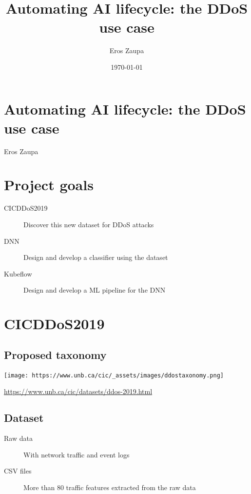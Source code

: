 \documentclass[11pt]{article}
\author{Eros Zaupa}
\date{\today}
\title{Automating AI lifecycle: the DDoS use case}
\begin{document}
\maketitle
\section*{Automating AI lifecycle: the DDoS use case}
\label{sec:orgd378da0}
Eros Zaupa
\section*{Project goals}
\label{sec:orgec83642}
\begin{description}
\item[{CICDDoS2019}] Discover this new dataset for DDoS attacks
\item[{DNN}] Design and develop a classifier using the dataset
\item[{Kubeflow}] Design and develop a ML pipeline for the DNN
\end{description}
\section*{CICDDoS2019}
\label{sec:orge860c77}
\subsection*{Proposed taxonomy}
\label{sec:org544229d}
\begin{center}
\texttt{[image: https://www.unb.ca/cic/\_assets/images/ddostaxonomy.png]}
\end{center}  \url{https://www.unb.ca/cic/datasets/ddos-2019.html}
\subsection*{Dataset}
\label{sec:org3a31181}
\begin{description}
\item[{Raw data}] With network traffic and event logs
\item[{CSV files}] More than 80 traffic features extracted from the raw
data
\end{description}
\end{document}
